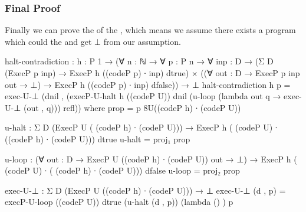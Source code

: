 \subsubsection{Final Proof}
Finally we can prove the  of the , which means we assume there exists a program  which could  the  and get $\bot$ from our assumption.
\begin{code}[fontsize=\small]
halt-contradiction : {h : P 1}
                   → (∀ {n : ℕ} → ∀ {p : P n} → ∀ {inp : D}
                      → (Σ D (ExecP p inp) 
			  → ExecP h ((codeP p) ∙ inp) dtrue)
                      ×  ((∀ {out : D} → ExecP p inp out → ⊥) 
			  → ExecP h ((codeP p) ∙ inp) dfalse))
                   → ⊥
halt-contradiction {h} p = exec-U-⊥ (dnil , 
				      (execP-U-halt {h} ((codeP U)) dnil 
				        (u-loop 
					  (lambda {out} q 
					      → exec-U-⊥ (out , q))) 
					refl))
  where
    prop = p {8}{U}{((codeP h) ∙ (codeP U))}
    
    u-halt : Σ D (ExecP U ( (codeP h) ∙ (codeP U))) 
	→ ExecP h ( (codeP U) ∙ ((codeP h) ∙ (codeP U))) dtrue
    u-halt = proj₁ prop

    u-loop : (∀ {out : D} → ExecP U ((codeP h) ∙  (codeP U)) out → ⊥) 
	→ ExecP h ( (codeP U) ∙ ( (codeP h) ∙  (codeP U))) dfalse
    u-loop = proj₂ prop

    exec-U-⊥ : Σ D (ExecP U ((codeP h) ∙ (codeP U))) → ⊥
    exec-U-⊥ (d , p) = execP-U-loop ((codeP U)) dtrue 
			(u-halt (d , p)) (lambda { () }) p
\end{code}
